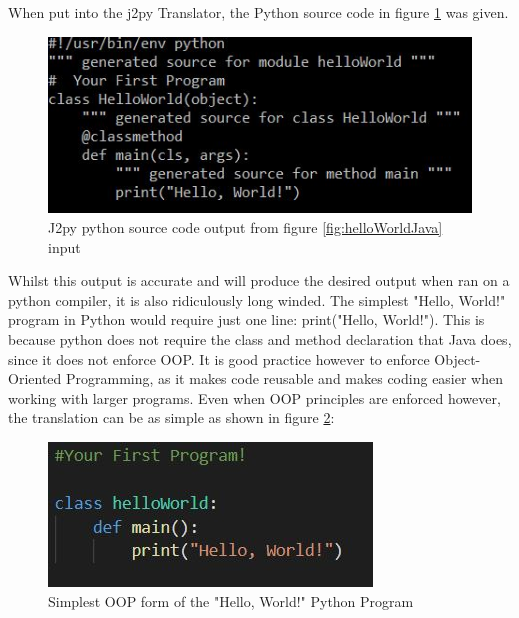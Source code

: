 \documentclass{l4proj}
\begin{document}
When put into the j2py Translator, the Python source code in figure \ref{fig:helloWorldJ2py} was given.

\begin{figure}[htb]
    \centering
    \includegraphics[width=1\linewidth]{images/helloWorldJ2py.JPG}
        \caption{J2py python source code output from figure \ref{fig:helloWorldJava} input
    }
    \label{fig:helloWorldJ2py} 
\end{figure}

Whilst this output is accurate and will produce the desired output when ran on a python compiler, it is also ridiculously long winded. The simplest "Hello, World!" program in Python would require just one line: print("Hello, World!"). This is because python does not require the class and method declaration that Java does, since it does not enforce OOP.
It is good practice however to enforce Object-Oriented Programming, as it makes code reusable and makes coding easier when working with larger programs. Even when OOP principles are enforced however, the translation can be as simple as shown in figure \ref{fig:helloWorldPy}:

\begin{figure}[htb]
    \centering
    \includegraphics[width=1\linewidth]{images/helloWorldPy.JPG}
        \caption{Simplest OOP form of the "Hello, World!" Python Program
    }
    \label{fig:helloWorldPy} 
\end{figure}
\end{document}
